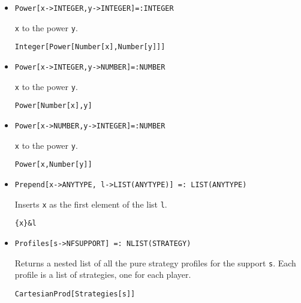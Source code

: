 \begin{itemize}
\item{}
\protect \large \begin{verbatim}
Power[x->INTEGER,y->INTEGER]=:INTEGER
\end{verbatim}\normalsize

\bd 
\verb+x+ to the power \verb+y+.
\begin{verbatim}
Integer[Power[Number[x],Number[y]]]
\end{verbatim} 
\ed

\item{}
\protect \large \begin{verbatim}
Power[x->INTEGER,y->NUMBER]=:NUMBER
\end{verbatim}\normalsize

\bd 
\verb+x+ to the power \verb+y+.
\begin{verbatim}
Power[Number[x],y]
\end{verbatim} 
\ed

\item{}
\protect \large \begin{verbatim}
Power[x->NUMBER,y->INTEGER]=:NUMBER
\end{verbatim}\normalsize

\bd 
\verb+x+ to the power \verb+y+.
\begin{verbatim}
Power[x,Number[y]]
\end{verbatim} 
\ed

\item{}
\protect \large \begin{verbatim}
Prepend[x->ANYTYPE, l->LIST(ANYTYPE)] =: LIST(ANYTYPE) 
\end{verbatim}\normalsize

\bd 
Inserts \verb+x+ as the first element of the list \verb+l+.  
\begin{verbatim}
{x}&l
\end{verbatim} 
\ed

\item{}
\protect \large \begin{verbatim}
Profiles[s->NFSUPPORT] =: NLIST(STRATEGY) 
\end{verbatim}\normalsize

\bd 
Returns a nested list of all the pure strategy profiles for the support
\verb+s+.  Each profile is a list of strategies, one for each player.  
\begin{verbatim}
CartesianProd[Strategies[s]]
\end{verbatim} 
\ed



\end{itemize}
